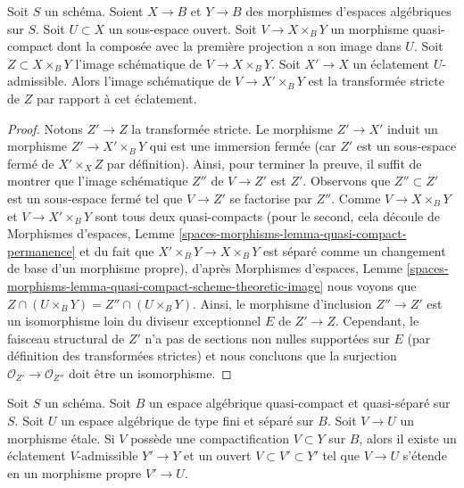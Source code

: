 \begin{lemma}
\label{lemma-replaced-by-strict-transform}
Soit $S$ un schéma. Soient $X \to B$ et $Y \to B$ des morphismes d'espaces algébriques sur $S$. Soit $U \subset X$ un sous-espace ouvert. Soit $V \to X \times_B Y$ un morphisme quasi-compact dont la composée avec la première projection a son image dans $U$. Soit $Z \subset X \times_B Y$ l'image schématique de $V \to X \times_B Y$. Soit $X' \to X$ un éclatement $U$-admissible. Alors l'image schématique de $V \to X' \times_B Y$ est la transformée stricte de $Z$ par rapport à cet éclatement.
\end{lemma}

\begin{proof}
Notons $Z' \to Z$ la transformée stricte. Le morphisme $Z' \to X'$
induit un morphisme $Z' \to X' \times_B Y$ qui est une immersion fermée
(car $Z'$ est un sous-espace fermé de $X' \times_X Z$ par définition).
Ainsi, pour terminer la preuve, il suffit de montrer que l'image schématique $Z''$ de $V \to Z'$ est $Z'$. Observons que $Z'' \subset Z'$
est un sous-espace fermé tel que $V \to Z'$ se factorise par $Z''$.
Comme $V \to X \times_B Y$ et $V \to X' \times_B Y$ sont tous deux
quasi-compacts (pour le second, cela découle de Morphismes d'espaces, Lemme
\ref{spaces-morphisms-lemma-quasi-compact-permanence}
et du fait que $X' \times_B Y \to X \times_B Y$ est séparé
comme un changement de base d'un morphisme propre), d'après Morphismes d'espaces, Lemme
\ref{spaces-morphisms-lemma-quasi-compact-scheme-theoretic-image}
nous voyons que $Z \cap (U \times_B Y) = Z'' \cap (U \times_B Y)$.
Ainsi, le morphisme d'inclusion $Z'' \to Z'$ est un isomorphisme loin du diviseur exceptionnel $E$ de $Z' \to Z$. Cependant, le faisceau structural de $Z'$ n'a pas de sections non nulles supportées sur $E$ (par définition des transformées strictes) et nous concluons que la surjection $\mathcal{O}_{Z'} \to \mathcal{O}_{Z''}$ doit être un isomorphisme. 
\end{proof}

\begin{lemma}
\label{lemma-compactification-dominates}
Soit $S$ un schéma. Soit $B$ un espace algébrique quasi-compact et quasi-séparé sur $S$. Soit $U$ un espace algébrique de type fini et séparé sur $B$. Soit $V \to U$ un morphisme \'etale. Si $V$ possède une compactification $V \subset Y$ sur $B$, alors il existe un éclatement $V$-admissible $Y' \to Y$ et un ouvert $V \subset V' \subset Y'$ tel que $V \to U$ s'étende en un morphisme propre $V' \to U$.
\end{lemma}

